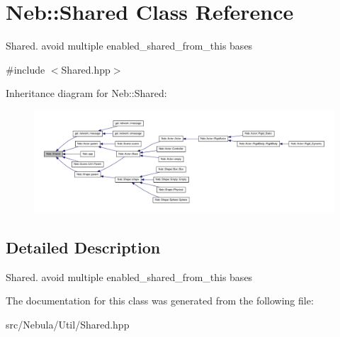 \hypertarget{classNeb_1_1Shared}{\section{\-Neb\-:\-:\-Shared \-Class \-Reference}
\label{classNeb_1_1Shared}
}


\-Shared. avoid multiple enabled\-\_\-shared\-\_\-from\-\_\-this bases  




{\ttfamily \#include $<$\-Shared.\-hpp$>$}



\-Inheritance diagram for \-Neb\-:\-:\-Shared\-:
\nopagebreak
\begin{figure}[H]
\begin{center}
\leavevmode
\includegraphics[width=350pt]{classNeb_1_1Shared__inherit__graph}
\end{center}
\end{figure}


\subsection{\-Detailed \-Description}
\-Shared. avoid multiple enabled\-\_\-shared\-\_\-from\-\_\-this bases 

\-The documentation for this class was generated from the following file\-:\begin{DoxyCompactItemize}
\item 
src/\-Nebula/\-Util/\-Shared.\-hpp\end{DoxyCompactItemize}
